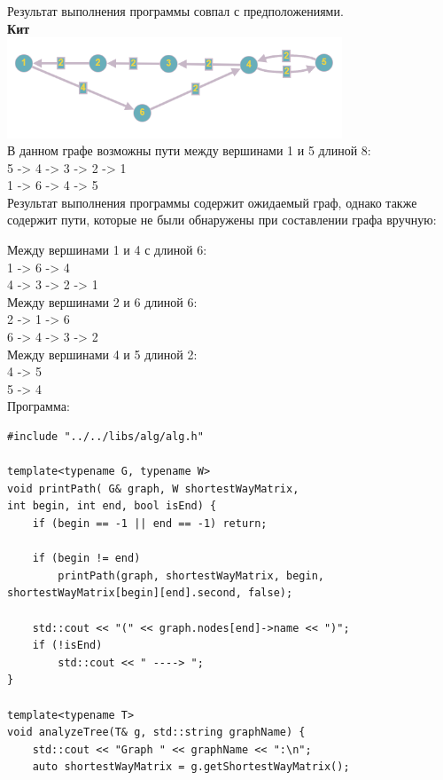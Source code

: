\documentclass[a4paper,14pt]{extarticle}
\begin{document}
\begin{enumerate}[1.]
        Результат выполнения программы совпал с предположениями.\\

        \textbf{Кит}\\
        \includegraphics[width=100mm]{testWhale}\\
        В данном графе возможны пути между вершинами 1 и 5 длиной 8:\\
        5 -> 4 -> 3 -> 2 -> 1\\
        1 -> 6 -> 4 -> 5\\

        Результат выполнения программы содержит ожидаемый граф, однако также 
        содержит пути, которые не были обнаружены при составлении графа вручную:
        
        Между вершинами 1 и 4 с длиной 6:\\
        1 -> 6 -> 4\\
        4 -> 3 -> 2 -> 1\\

        Между вершинами 2 и 6 длиной 6:\\
        2 -> 1 -> 6\\
        6 -> 4 -> 3 -> 2\\

        Между вершинами 4 и 5 длиной 2:\\
        4 -> 5\\
        5 -> 4\\

        Программа:
        \begin{verbatim}
#include "../../libs/alg/alg.h"

template<typename G, typename W>
void printPath( G& graph, W shortestWayMatrix, 
int begin, int end, bool isEnd) {
    if (begin == -1 || end == -1) return;

    if (begin != end)
        printPath(graph, shortestWayMatrix, begin, shortestWayMatrix[begin][end].second, false);

    std::cout << "(" << graph.nodes[end]->name << ")";
    if (!isEnd)
        std::cout << " ----> ";
}

template<typename T>
void analyzeTree(T& g, std::string graphName) {
    std::cout << "Graph " << graphName << ":\n";
    auto shortestWayMatrix = g.getShortestWayMatrix();
    

\end{verbatim}
\end{enumerate}
\end{document}
